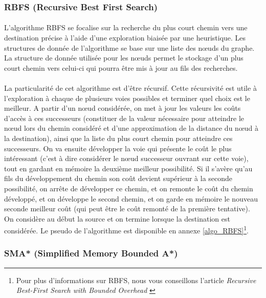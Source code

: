 \documentclass[pidr]{tnreport}
\begin{document}
			\subsubsection{RBFS (Recursive Best First Search)}
\paragraph{}	
L'algorithme RBFS se focalise sur la recherche du plus court chemin vers une destination précise à l'aide d'une exploration biaisée par une heuristique. Les structures de donnée de l'algorithme se base sur une liste des nœuds du graphe. La structure de donnée utilisée pour les nœuds permet le stockage d'un plus court chemin vers celui-ci qui pourra être mis à jour au fils des recherches.

\paragraph{}	
La particularité de cet algorithme est d'être récursif. Cette récursivité est utile à l'exploration à chaque de plusieurs voies possibles et terminer quel choix est le meilleur. A partir d'un nœud considérée, on met à jour les valeurs les coûts d'accès à ces successeurs (constituer de la valeur nécessaire pour atteindre le nœud lors du chemin considéré et d'une approximation de la distance du nœud à la destination), ainsi que la liste du plus court chemin pour atteindre ces successeurs. On va ensuite développer la voie qui présente le coût le plus intéressant (c'est à dire considérer le nœud successeur ouvrant sur cette voie), tout en gardant en mémoire la deuxième meilleur possibilité. Si il s'avère qu'au fils du développement du chemin son coût devient supérieur à la seconde possibilité, on arrête de développer ce chemin, et on remonte le coût du chemin développé, et on développe le second chemin, et on garde en mémoire le nouveau seconde meilleur coût (qui peut être le coût remonté de la première tentative). On considère au début la source et on termine lorsque la destination est considérée.  
\newline\newline
Le pseudo de l'algorithme est disponible en annexe \ref{algo_RBFS}\footnote{Pour plus d'informations sur RBFS, nous vous conseillons l'article \textit{Recursive Best-First Search with Bounded Overhead} \cite{Scottma}}.
	
			\subsubsection{SMA* (Simplified Memory Bounded A*)}	
\end{document}
